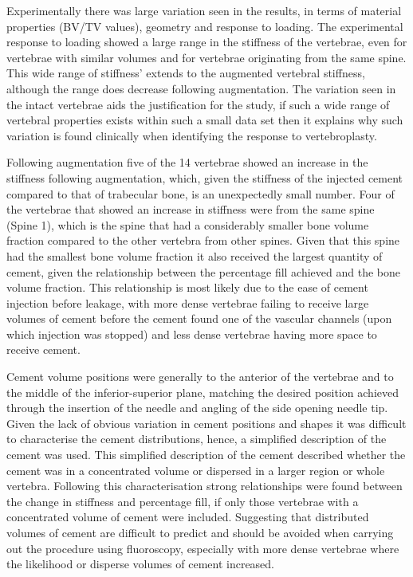 Experimentally there was large variation seen in the results, in terms of
material properties (BV/TV values), geometry and response to loading.  The
experimental response to loading showed a large range in the stiffness of the
vertebrae, even for vertebrae with similar volumes and for vertebrae
originating from the same spine.  This wide range of stiffness' extends to the
augmented vertebral stiffness, although the range does decrease following
augmentation.  The variation seen in the intact vertebrae aids the
justification for the study, if such a wide range of vertebral properties
exists within such a small data set then it explains why such variation is
found clinically when identifying the response to vertebroplasty.

Following augmentation five of the 14 vertebrae showed an increase in the
stiffness following augmentation, which, given the stiffness of the injected
cement compared to that of trabecular bone, is an unexpectedly small number.
Four of the vertebrae that showed an increase in stiffness were from the same
spine (Spine 1), which is the spine that had a considerably smaller bone volume
fraction compared to the other vertebra from other spines.  Given that this
spine had the smallest bone volume fraction it also received the largest
quantity of cement, given the relationship between the percentage fill achieved
and the bone volume fraction.  This relationship is most likely due to the ease
of cement injection before leakage, with more dense vertebrae failing to
receive large volumes of cement before the cement found one of the vascular
channels (upon which injection was stopped) and less dense vertebrae having
more space to receive cement.

Cement volume positions were generally to the anterior of the vertebrae and to
the middle of the inferior-superior plane, matching the desired position
achieved through the insertion of the needle and angling of the side opening
needle tip.  Given the lack of obvious variation in cement positions and shapes
it was difficult to characterise the cement distributions, hence, a simplified
description of the cement was used.  This simplified description of the cement
described whether the cement was in a concentrated volume or dispersed in a
larger region or whole vertebra.  Following this characterisation strong
relationships were found between the change in stiffness and percentage fill,
if only those vertebrae with a concentrated volume of cement were included.
Suggesting that distributed volumes of cement are difficult to predict and
should be avoided when carrying out the procedure using fluoroscopy, especially
with more dense vertebrae where the likelihood or disperse volumes of cement
increased.


